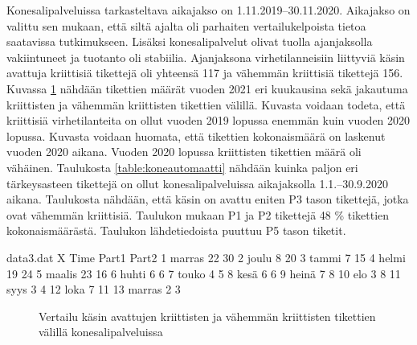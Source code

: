 Konesalipalveluissa tarkasteltava aikajakso on 1.11.2019--30.11.2020. Aikajakso on valittu sen mukaan, että siltä ajalta oli parhaiten vertailukelpoista tietoa saatavissa tutkimukseen. Lisäksi konesalipalvelut olivat tuolla ajanjaksolla vakiintuneet ja tuotanto oli stabiilia. Ajanjaksona virhetilanneisiin liittyviä käsin avattuja kriittisiä tikettejä oli yhteensä 117 ja vähemmän kriittisiä tikettejä 156. Kuvassa \ref{fig:konesalitiketit} nähdään tikettien määrät vuoden 2021 eri kuukausina sekä jakautuma kriittisten ja vähemmän kriittisten tikettien välillä. Kuvasta voidaan todeta, että kriittisiä virhetilanteita on ollut vuoden 2019 lopussa enemmän kuin vuoden 2020 lopussa. Kuvasta voidaan huomata, että tikettien kokonaismäärä on laskenut vuoden 2020 aikana. Vuoden 2020 lopussa kriittisten tikettien määrä oli vähäinen.  Taulukosta \ref{table:koneautomaatti} nähdään kuinka paljon eri tärkeysasteen tikettejä on ollut konesalipalveluissa aikajaksolla 1.1.--30.9.2020 aikana. Taulukosta nähdään, että käsin on avattu eniten P3 tason tikettejä, jotka ovat vähemmän kriittisiä. Taulukon mukaan P1 ja P2 tikettejä 48 \% tikettien kokonaismäärästä. Taulukon lähdetiedoista puuttuu P5 tason tiketit.

\begin{filecontents}{data3.dat}
X Time  	Part1  Part2
1 marras  	22	    30
2 joulu		8	    20
3 tammi 	7	    15
4 helmi		19	    24
5 maalis	23	    16
6 huhti		6	    6
7 touko		4	    5
8 kesä      6       6
9 heinä     7       8
10 elo      3       8
11 syys     3       4
12 loka     7       11
13 marras   2       3
\end{filecontents}

\begin{figure}[ht]
\caption{Vertailu käsin avattujen kriittisten ja vähemmän kriittisten tikettien välillä konesalipalveluissa}
\label{fig:konesalitiketit}
\end{figure}

